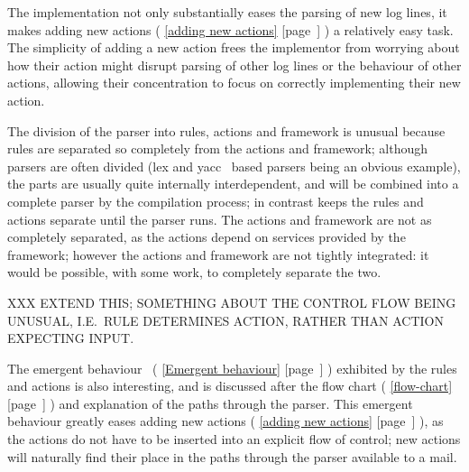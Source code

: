 \documentclass[a4paper,12pt,draft]{article}
\newcommand{\parsername}{\PLP{}}
\newcommand{\refwithpage}[1]{%
    \empty{}\ref{#1} [page~\pageref{#1}]%
}
\newcommand{\sectionref}[1]{%
    \textsection{}\refwithpage{#1}%
}
\begin{document}
The implementation not only substantially eases the parsing of new log
lines, it makes adding new actions (\sectionref{adding new actions}) a
relatively easy task.  The simplicity of adding a new action frees the
implementor from worrying about how their action might disrupt parsing of
other log lines or the behaviour of other actions, allowing their
concentration to focus on correctly implementing their new action.


The division of the parser into rules, actions and framework is unusual
because rules are separated so completely from the actions and framework;
although parsers are often divided (lex and yacc~\cite{lex-and-yacc} based
parsers being an obvious example), the parts are usually quite internally
interdependent, and will be combined into a complete parser by the
compilation process; in contrast \parsername{} keeps the rules and actions
separate until the parser runs.  The actions and framework are not as
completely separated, as the actions depend on services provided by the
framework; however the actions and framework are not tightly integrated: it
would be possible, with some work, to completely separate the two.

XXX EXTEND THIS\@; SOMETHING ABOUT THE CONTROL FLOW BEING UNUSUAL, I.E.\
RULE DETERMINES ACTION, RATHER THAN ACTION EXPECTING INPUT\@.


The emergent behaviour~\cite{Wikipedia-Emergence} (\sectionref{Emergent
behaviour}) exhibited by the rules and actions is also interesting, and is
discussed after the flow chart (\sectionref{flow-chart}) and explanation of
the paths through the parser.  This emergent behaviour greatly eases adding
new actions (\sectionref{adding new actions}), as the actions do not have
to be inserted into an explicit flow of control; new actions will naturally
find their place in the paths through the parser available to a mail.
\end{document}
